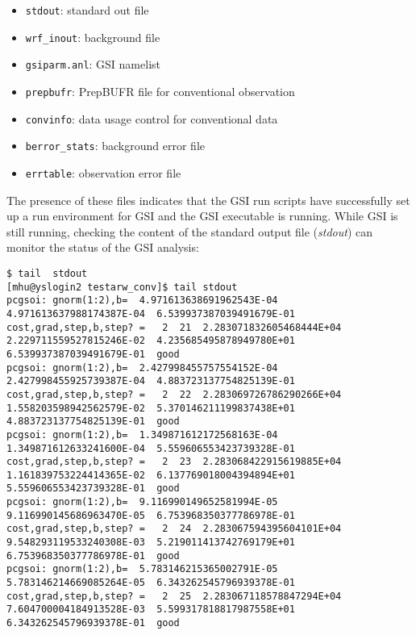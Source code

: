 \begin{itemize}
\item \verb|stdout|:		standard out file
\item \verb|wrf_inout|:  	background file
\item \verb|gsiparm.anl|:   	GSI namelist
\item \verb|prepbufr|:  	PrepBUFR file for conventional observation
\item \verb|convinfo|: 		data usage control for conventional data
\item \verb|berror_stats|: 	background error file
\item \verb|errtable|: 		observation error file
\end{itemize}

The presence of these files indicates that the GSI run scripts have successfully set up a run environment for GSI and the GSI executable is running.  While GSI is still running, checking the content of the standard output file (\textit{stdout}) can monitor the status of the GSI analysis:

\begin{tiny}
\begin{verbatim}
$ tail  stdout
[mhu@yslogin2 testarw_conv]$ tail stdout
pcgsoi: gnorm(1:2),b=  4.971613638691962543E-04  4.971613637988174387E-04  6.539937387039491679E-01
cost,grad,step,b,step? =   2  21  2.283071832605468444E+04  2.229711559527815246E-02  4.235685495878949780E+01  6.539937387039491679E-01  good 
pcgsoi: gnorm(1:2),b=  2.427998455757554152E-04  2.427998455925739387E-04  4.883723137754825139E-01
cost,grad,step,b,step? =   2  22  2.283069726786290266E+04  1.558203598942562579E-02  5.370146211199837438E+01  4.883723137754825139E-01  good 
pcgsoi: gnorm(1:2),b=  1.349871612172568163E-04  1.349871612633241600E-04  5.559606553423739328E-01
cost,grad,step,b,step? =   2  23  2.283068422915619885E+04  1.161839753224414365E-02  6.137769018004394894E+01  5.559606553423739328E-01  good 
pcgsoi: gnorm(1:2),b=  9.116990149652581994E-05  9.116990145686963470E-05  6.753968350377786978E-01
cost,grad,step,b,step? =   2  24  2.283067594395604101E+04  9.548293119533240308E-03  5.219011413742769179E+01  6.753968350377786978E-01  good 
pcgsoi: gnorm(1:2),b=  5.783146215365002791E-05  5.783146214669085264E-05  6.343262545796939378E-01
cost,grad,step,b,step? =   2  25  2.283067118578847294E+04  7.604700004184913528E-03  5.599317818817987558E+01  6.343262545796939378E-01  good 
\end{verbatim}
\end{tiny}

